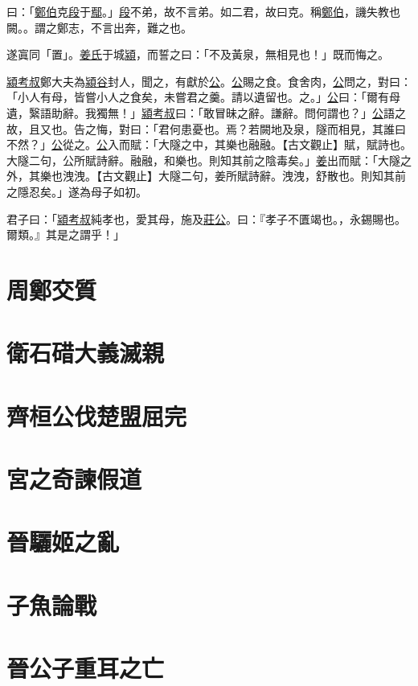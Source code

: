 \documentclass{article}
\newcommand{\tsu}{\small\kaishu\color{brown}}
\newcommand{\ta}{\small\kaishu\color{applegreen}}
\begin{document}
曰：「\uline{鄭伯}克\uline{段}于\uline{鄢}。」\uline{段}不弟，故不言弟。如二君，故曰克。稱\uline{鄭伯}，譏失教也{\tsu 闕。}。謂之鄭志，不言出奔，難之也。

遂寘{\tsu 同「置」。}\uline{姜氏}于城\uline{潁}，而誓之曰：「不及黃泉，無相見也！」既而悔之。

\uline{潁考叔}{\tsu 鄭大夫}為\uline{潁谷}封人，聞之，有獻於\uline{公}。\uline{公}賜之食。食舍肉，\uline{公}問之，對曰：「小人有母，皆嘗小人之食矣，未嘗君之羹。請以遺{\tsu 留也。}之。」\uline{公}曰：「爾有母遺，繄{\tsu 語助辭。}我獨無！」\uline{潁考叔}曰：「敢{\tsu 冒昧之辭。謙辭。}問何謂也？」\uline{公}語之故，且{\tsu 又也。}告之悔，對曰：「君何患{\tsu 憂也。}焉？若闕地及泉，隧而相見，其誰曰不然？」\uline{公}從之。\uline{公}入而賦：「大隧之中，其樂也融融。{\ta 【古文觀止】賦，賦詩也。大隧二句，公所賦詩辭。融融，和樂也。則知其前之陰毒矣。}」\uline{姜}出而賦：「大隧之外，其樂也洩洩。{\ta 【古文觀止】大隧二句，姜所賦詩辭。洩洩，舒散也。則知其前之隱忍矣。}」遂為母子如初。

君子曰：「\uline{潁考叔}純孝也，愛其母，施及\uline{莊公}。曰：『孝子不匱{\tsu 竭也。}，永錫{\tsu 賜也。}爾類。』其是之謂乎！」

\section{周鄭交質}

\section{衛石碏大義滅親}

\section{齊桓公伐楚盟屈完}

\section{宮之奇諫假道}

\section{晉驪姬之亂}

\section{子魚論戰}

\section{晉公子重耳之亡}
\end{document}
